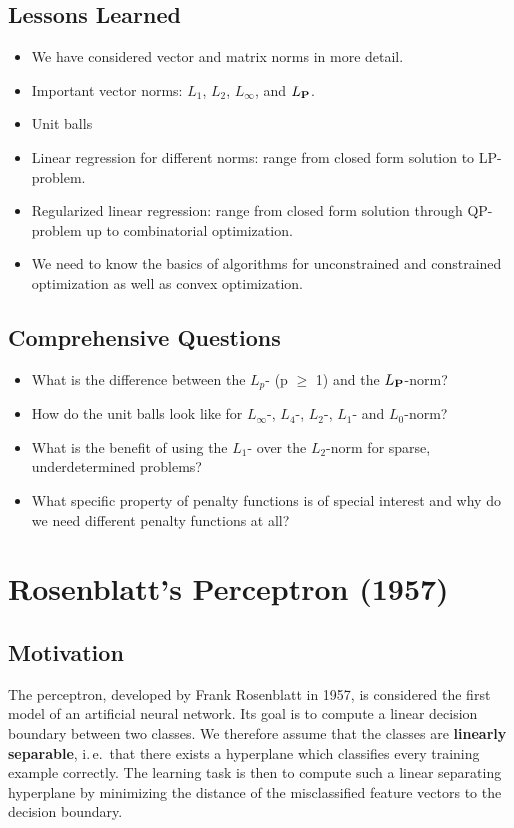 \subsection{Lessons Learned}
  \begin{itemize}
    \item We have considered vector and matrix norms in more detail. 
    \item Important vector norms: $L_1$, $L_2$, $L_\infty$, and $L_{\mathbf{P}}$. 
    \item Unit balls 
    \item Linear regression for different norms: range from closed form solution to LP-problem.
    \item Regularized linear regression: range from closed form solution through QP-problem up to combinatorial optimization. 
    \item We need to know the basics of algorithms for unconstrained and constrained optimization as well as convex optimization.
  \end{itemize}

\subsection{Comprehensive Questions}
  \begin{itemize}
    \item What is the difference between the $L_p$- (p $\ge$ 1) and the $L_{\mathbf{P}}$-norm? 
    \item How do the unit balls look like for $L_{\infty}$-, $L_4$-, $L_2$-, $L_1$- and $L_0$-norm? 
    \item What is the benefit of using the $L_1$- over the $L_2$-norm for sparse, underdetermined problems? 
    \item What specific property of penalty functions is of special interest and why do we need different penalty functions at all? 
  \end{itemize}

\newpage
\section{Rosenblatt's Perceptron (1957)}\autocite{hastie2009,ripley1996,rosenblatt1958}

\subsection{Motivation}

The perceptron, developed by Frank Rosenblatt in 1957, is considered the first model of an artificial neural network. Its goal is to compute a linear decision boundary between two classes. We therefore assume that the classes are \textbf{linearly separable}, i.\,e.\ that there exists a hyperplane which classifies every training example correctly. The learning task is then to compute such a linear separating hyperplane by minimizing the distance of the misclassified feature vectors to the decision boundary.

